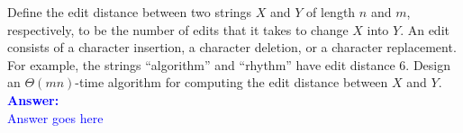 \item{}
Define the edit distance between two strings $X$ and $Y$ of length $n$ and $m$,
respectively, to be the number of edits that it takes to change $X$ into $Y$. An
edit consists of a character insertion, a character deletion, or a character
replacement. For example, the strings ``algorithm'' and ``rhythm'' have edit
distance $6$. Design an $\Theta(mn)$-time algorithm for computing the edit
distance between $X$ and $Y$.\\[12pt]
\ifanswers
\textcolor{blue}{
\textbf{Answer:}\\[6pt]
Answer goes here
}
\newpage
\fi
